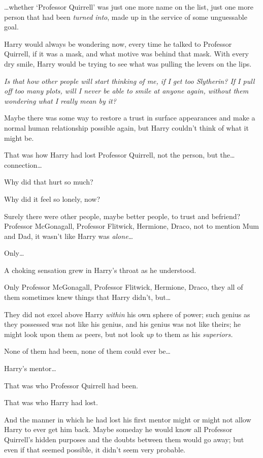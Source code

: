 {\ldots}whether `Professor Quirrell' was just one more name on the list, just 
one more person that had been \emph{turned into}, made up in the service of 
some unguessable goal.

Harry would always be wondering now, every time he talked to Professor 
Quirrell, if it was a mask, and what motive was behind that mask. With every 
dry smile, Harry would be trying to see what was pulling the levers on the lips.

\emph{Is that how other people will start thinking of me, if I get too 
Slytherin? If I pull off too many plots, will I never be able to smile at 
anyone again, without them wondering what I really mean by it?}

Maybe there was some way to restore a trust in surface appearances and make a 
normal human relationship possible again, but Harry couldn't think of what it 
might be.

That was how Harry had lost Professor Quirrell, not the person, but the{\ldots} 
connection{\ldots}

Why did that hurt so much?

Why did it feel so lonely, now?

Surely there were other people, maybe better people, to trust and befriend? 
Professor McGonagall, Professor Flitwick, Hermione, Draco, not to mention Mum 
and Dad, it wasn't like Harry was \emph{alone{\ldots}}

Only{\ldots}

A choking sensation grew in Harry's throat as he understood.

Only Professor McGonagall, Professor Flitwick, Hermione, Draco, they all of 
them sometimes knew things that Harry didn't, but{\ldots}

They did not excel above Harry \emph{within} his own sphere of power; such 
genius as they possessed was not like his genius, and his genius was not like 
theirs; he might look upon them as peers, but not look \emph{up} to them as his 
\emph{superiors.}

None of them had been, none of them could ever be{\ldots}

Harry's mentor{\ldots}

That was who Professor Quirrell had been.

That was who Harry had lost.

And the manner in which he had lost his first mentor might or might not allow 
Harry to ever get him back. Maybe someday he would know all Professor 
Quirrell's hidden purposes and the doubts between them would go away; but even 
if that seemed possible, it didn't seem very probable.

